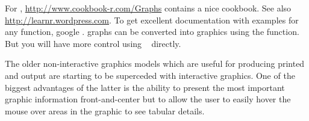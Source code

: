 For , \url{http://www.cookbook-r.com/Graphs} contains a
nice cookbook.  See also \url{http://learnr.wordpress.com}.  To get
excellent documentation with examples for any 
 function, google .
 graphs can be converted into  graphics using
the  function.  But you will have more control using
\R\  directly.

The older non-interactive graphics models which are useful for
producing printed and  output are starting to be superceded
with interactive graphics.  One of the biggest advantages of the
latter is the ability to present the most important graphic
information front-and-center but to allow the user to easily hover the
mouse over areas in the graphic to see tabular details.



